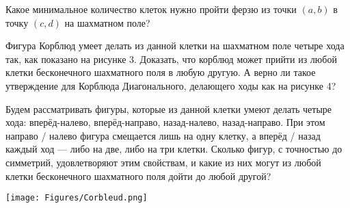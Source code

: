 \begin{itemize}
\itA Какое минимальное количество клеток нужно пройти ферзю из точки $(a,b)$ в точку $(c,d)$ на шахматном поле?

\itB Фигура Корблюд умеет делать из данной клетки на шахматном поле четыре хода так, как показано на рисунке 3. Доказать, что корблюд может прийти из любой клетки бесконечного шахматного поля в любую другую. А верно ли такое утверждение для Корблюда Диагонального, делающего ходы как на рисунке 4?

\itC Будем рассматривать фигуры, которые из данной клетки умеют делать четыре хода: вперёд-налево, вперёд-направо, назад-налево, назад-направо. При этом направо / налево фигура смещается лишь на одну клетку, а вперёд / назад каждый ход — либо на две, либо на три клетки. Сколько фигур, с точностью до симметрий, удовлетворяют этим свойствам, и какие из них могут из любой клетки бесконечного шахматного поля дойти до любой другой?
\end{itemize}

\begin{center}
  \texttt{[image: Figures/Corbleud.png]}
\end{center}

